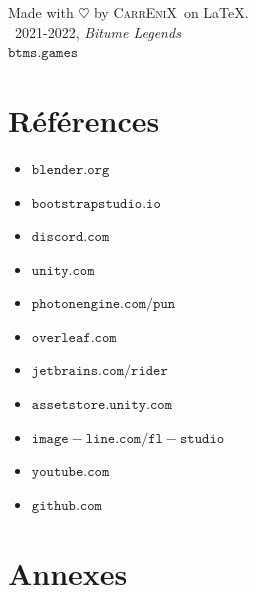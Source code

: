 \documentclass[12pt,a4paper]{article}
\newcommand{\btmlgs}{\textsl{Bitume Legends}}
\newcommand{\CEX}{\textsc{CarrEniX}}
\newcommand{\SITE}{\(\mathtt{btms.games}\)}
\begin{document}
    \begin{center}
        Made with $\heartsuit$ by \CEX\, on \LaTeX.\\
        \textcopyright\, 2021-2022, \btmlgs\\
        \SITE
    \end{center}


    \clearpage
    \section*{Références}
        \begin{itemize}
            \item \(\mathtt{blender.org}\)
            \item \(\mathtt{bootstrapstudio.io}\)
            \item \(\mathtt{discord.com}\)
            \item \(\mathtt{unity.com}\)
            \item \(\mathtt{photonengine.com/pun}\)
            \item \(\mathtt{overleaf.com}\)
            \item \(\mathtt{jetbrains.com/rider}\)
            \item \(\mathtt{assetstore.unity.com}\)
            \item \(\mathtt{image-line.com/fl-studio}\)
            \item \(\mathtt{youtube.com}\)
            \item \(\mathtt{github.com}\)
        \end{itemize}


    \section*{Annexes}
        \listoftables
        \listoffigures
        \clearpage
\end{document}
